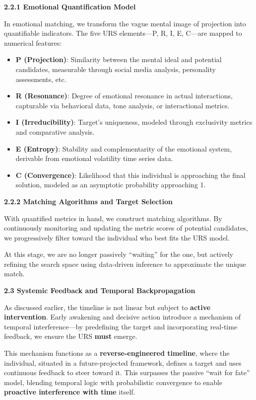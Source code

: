 \documentclass[
]{article}
\begin{document}
\textbf{2.2.1 Emotional Quantification Model}

In emotional matching, we transform the vague mental image of projection
into quantifiable indicators. The five URS elements---P, R, I, E,
C---are mapped to numerical features:

\begin{itemize}
\item
  \textbf{P (Projection)}: Similarity between the mental ideal and
  potential candidates, measurable through social media analysis,
  personality assessments, etc.
\item
  \textbf{R (Resonance)}: Degree of emotional resonance in actual
  interactions, capturable via behavioral data, tone analysis, or
  interactional metrics.
\item
  \textbf{I (Irreducibility)}: Target's uniqueness, modeled through
  exclusivity metrics and comparative analysis.
\item
  \textbf{E (Entropy)}: Stability and complementarity of the emotional
  system, derivable from emotional volatility time series data.
\item
  \textbf{C (Convergence)}: Likelihood that this individual is
  approaching the final solution, modeled as an asymptotic probability
  approaching 1.
\end{itemize}

\textbf{2.2.2 Matching Algorithms and Target Selection}

With quantified metrics in hand, we construct matching algorithms. By
continuously monitoring and updating the metric scores of potential
candidates, we progressively filter toward the individual who best fits
the URS model.

At this stage, we are no longer passively ``waiting'' for the one, but
actively refining the search space using data-driven inference to
approximate the unique match.

\textbf{2.3 Systemic Feedback and Temporal Backpropagation}

As discussed earlier, the timeline is not linear but subject to
\textbf{active intervention}. Early awakening and decisive action
introduce a mechanism of temporal interference---by predefining the
target and incorporating real-time feedback, we ensure the URS
\textbf{must} emerge.

This mechanism functions as a \textbf{reverse-engineered timeline},
where the individual, situated in a future-projected framework, defines
a target and uses continuous feedback to steer toward it. This surpasses
the passive ``wait for fate'' model, blending temporal logic with
probabilistic convergence to enable \textbf{proactive interference with
time} itself.
\end{document}
